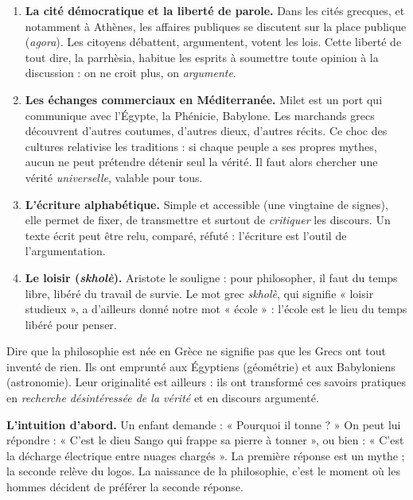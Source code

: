 \documentclass[11pt]{article}
\newcommand{\cle}[1]{{\popxbold\color{popdark}#1}}
\newcounter{popsec}
\newcounter{popsub}
\newcommand{\courssub}[1]{%
  \stepcounter{popsub}%
  \par\vspace{9pt}\noindent{\popxbold\fontsize{11.5}{13}\selectfont\color{popink}{\color{poporange}\thepopsec.\thepopsub}\hspace{6pt}#1}\par\nopagebreak\vspace{4pt}
}
\begin{document}
\begin{enumerate}
\item \textbf{La cité démocratique et la liberté de parole.} Dans les cités grecques, et notamment à Athènes, les affaires publiques se discutent sur la place publique (\emph{agora}). Les citoyens débattent, argumentent, votent les lois. Cette liberté de tout dire, la \cle{parrhèsia}, habitue les esprits à soumettre toute opinion à la discussion : on ne croit plus, on \emph{argumente}.
\item \textbf{Les échanges commerciaux en Méditerranée.} Milet est un port qui communique avec l'Égypte, la Phénicie, Babylone. Les marchands grecs découvrent d'autres coutumes, d'autres dieux, d'autres récits. Ce choc des cultures relativise les traditions : si chaque peuple a ses propres mythes, aucun ne peut prétendre détenir seul la vérité. Il faut alors chercher une vérité \emph{universelle}, valable pour tous.
\item \textbf{L'écriture alphabétique.} Simple et accessible (une vingtaine de signes), elle permet de fixer, de transmettre et surtout de \emph{critiquer} les discours. Un texte écrit peut être relu, comparé, réfuté : l'écriture est l'outil de l'argumentation.
\item \textbf{Le loisir (\emph{skholè}).} Aristote le souligne : pour philosopher, il faut du temps libre, libéré du travail de survie. Le mot grec \emph{skholè}, qui signifie « loisir studieux », a d'ailleurs donné notre mot « école » : l'école est le lieu du temps libéré pour penser.
\end{enumerate}

\begin{attention}
Dire que la philosophie est née en Grèce ne signifie pas que les Grecs ont tout inventé de rien. Ils ont emprunté aux Égyptiens (géométrie) et aux Babyloniens (astronomie). Leur originalité est ailleurs : ils ont transformé ces savoirs pratiques en \emph{recherche désintéressée de la vérité} et en discours argumenté.
\end{attention}

\courssub{Le passage du mythe au logos}

\textbf{L'intuition d'abord.} Un enfant demande : « Pourquoi il tonne ? » On peut lui répondre : « C'est le dieu Sango qui frappe sa pierre à tonner », ou bien : « C'est la décharge électrique entre nuages chargés ». La première réponse est un \cle{mythe} ; la seconde relève du \cle{logos}. La naissance de la philosophie, c'est le moment où les hommes décident de préférer la seconde réponse.
\end{document}
